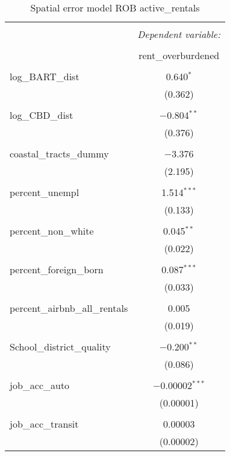 \documentclass[10pt, letterpaper]{amsart}
\begin{document}
\begin{table}[H] \centering 
  \caption{Spatial error model ROB active\_rentals}
  \label{} 
  \begin{tabular}{@{\extracolsep{5pt}}lc} 
    \\[-1.8ex]\hline 
    \hline \\[-1.8ex] 
    & \multicolumn{1}{c}{\textit{Dependent variable:}} \\ 
    \cline{2-2} 
    \\[-1.8ex] & rent\_overburdened \\ 
    \hline \\[-1.8ex] 
    log\_BART\_dist & 0.640$^{*}$ \\ 
    & (0.362) \\ 
    & \\ 
    log\_CBD\_dist & $-$0.804$^{**}$ \\ 
    & (0.376) \\ 
    & \\ 
    coastal\_tracts\_dummy & $-$3.376 \\ 
    & (2.195) \\ 
    & \\ 
    percent\_unempl & 1.514$^{***}$ \\ 
    & (0.133) \\ 
    & \\ 
    percent\_non\_white & 0.045$^{**}$ \\ 
    & (0.022) \\ 
    & \\ 
    percent\_foreign\_born & 0.087$^{***}$ \\ 
    & (0.033) \\ 
    & \\ 
    percent\_airbnb\_all\_rentals & 0.005 \\ 
    & (0.019) \\ 
    & \\ 
    School\_district\_quality & $-$0.200$^{**}$ \\ 
    & (0.086) \\ 
    & \\ 
    job\_acc\_auto & $-$0.00002$^{***}$ \\ 
    & (0.00001) \\ 
    & \\ 
    job\_acc\_transit & 0.00003 \\ 
    & (0.00002) \\ 

\end{tabular}
\end{table}
\end{document}
